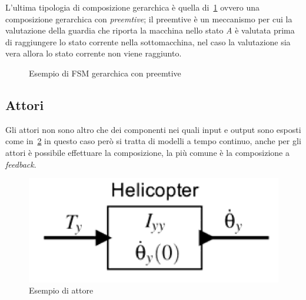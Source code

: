 L'ultima tipologia di composizione gerarchica è quella di \figurename\,\ref{fig:preemtiveger} ovvero una composizione gerarchica con \emph{preemtive}; il preemtive è un meccanismo per cui la valutazione della guardia che riporta la macchina nello stato \emph{A} è valutata prima di raggiungere lo stato corrente nella sottomacchina, nel caso la valutazione sia vera allora lo stato corrente non viene raggiunto.
\begin{figure}
\centering
{}
\caption{Esempio di FSM gerarchica con preemtive}\label{fig:preemtiveger}
\end{figure}
\subsection{Attori}
Gli attori non sono altro che dei componenti nei quali input e output sono esposti come in \figurename\,\ref{fig:attore} in questo caso però si tratta di modelli a tempo continuo, anche per gli  attori è possibile effettuare la composizione, la più comune è la composizione a \emph{feedback}.
\begin{figure}
\centering
\includegraphics[scale=0.4]{img/attore.png}
\caption{Esempio di attore}\label{fig:attore}
\end{figure}

